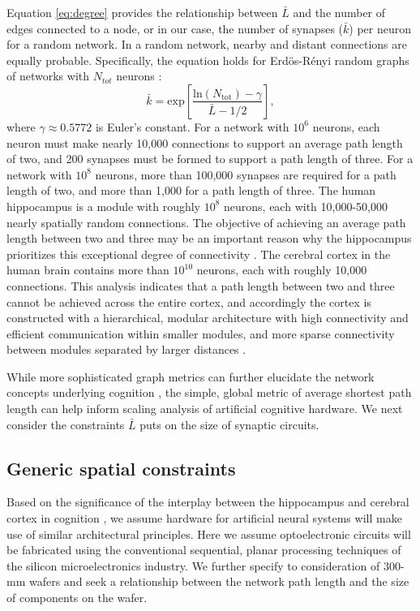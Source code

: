 \documentclass[twocolumn]{article}
\begin{document}
Equation \ref{eq:degree} provides the relationship between $\bar{L}$ and the number of edges connected to a node, or in our case, the number of synapses ($\bar{k}$) per neuron for a random network. In a random network, nearby and distant connections are equally probable. Specifically, the equation holds for Erd\"{o}s-R\'{e}nyi random graphs of networks with $N_{tot}$ neurons \cite{frfr2004}:
\begin{equation}
\label{eq:degree}
\bar{k} = \mathrm{exp} \left[ \frac{\mathrm{ln}(N_{\mathrm{tot}})-\gamma}{\bar{L}-1/2} \right],
\end{equation}
where $\gamma \approx 0.5772$ is Euler's constant. For a network with $10^6$ neurons, each neuron must make nearly 10,000 connections to support an average path length of two, and 200 synapses must be formed to support a path length of three. For a network with $10^8$ neurons, more than 100,000 synapses are required for a path length of two, and more than 1,000 for a path length of three. The human hippocampus is a module with roughly $10^8$ neurons, each with 10,000-50,000 nearly spatially random connections. The objective of achieving an average path length between two and three may be an important reason why the hippocampus prioritizes this exceptional degree of connectivity \cite{bu2006}. The cerebral cortex in the human brain contains more than $10^{10}$ neurons, each with roughly 10,000 connections. This analysis indicates that a path length between two and three cannot be achieved across the entire cortex, and accordingly the cortex is constructed with a hierarchical, modular architecture \cite{si1962,ne2006} with high connectivity and efficient communication within smaller modules, and more sparse connectivity between modules separated by larger distances \cite{mo1997,mela2009,bosp2015,beba2017}.

While more sophisticated graph metrics can further elucidate the network concepts underlying cognition \cite{busp2009,sp2010}, the simple, global metric of average shortest path length can help inform scaling analysis of artificial cognitive hardware. We next consider the constraints $\bar{L}$ puts on the size of synaptic circuits.

\subsection{Generic spatial constraints}
\label{sec:spatial_constraints}
Based on the significance of the interplay between the hippocampus and cerebral cortex in cognition \cite{frbu2016}, we assume hardware for artificial neural systems will make use of similar architectural principles. Here we assume optoelectronic circuits will be fabricated using the conventional sequential, planar processing techniques of the silicon microelectronics industry. We further specify to consideration of 300-mm wafers and seek a relationship between the network path length and the size of components on the wafer.
\end{document}
